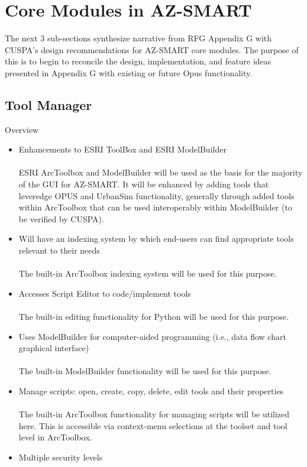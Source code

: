\documentclass[titlepage]{article}
\begin{document}
\section{Core Modules in AZ-SMART}
The next 3 sub-sections synthesize narrative from RFG Appendix G with CUSPA's design recommendations for AZ-SMART core modules.  The purpose of this is to begin to reconcile the design, implementation, and feature ideas presented in Appendix G with existing or future Opus functionality.

\subsection{Tool Manager}
Overview
\begin{itemize}
	\item Enhancements to ESRI ToolBox and ESRI ModelBuilder
	\\\\
	ESRI ArcToolbox and ModelBuilder will be used as the basis for the majority of the GUI for AZ-SMART.  It will be enhanced by adding tools that leveredge OPUS and UrbanSim functionality, generally through added tools within ArcToolbox that can be used interoperably within ModelBuilder (to be verified by CUSPA).
	\item Will have an indexing system by which end-users can find appropriate tools relevant to their needs
	\\\\
	The built-in ArcToolbox indexing system will be used for this purpose.
	\item Accesses Script Editor to code/implement tools
	\\\\
	The built-in editing functionality for Python will be used for this purpose.
	\item Uses ModelBuilder for computer-aided programming (i.e., data flow chart graphical interface)
	\\\\
	The built-in ModelBuilder functionality will be used for this purpose.
	\item Manage scripts: open, create, copy, delete, edit tools and their properties
	\\\\
	The built-in ArcToolbox functionality for managing scripts will be utilized here.  This is accessible via context-menu selections at the toolset and tool level in ArcToolbox.
	\item Multiple security levels
	\\\\

\end{itemize}
\end{document}
